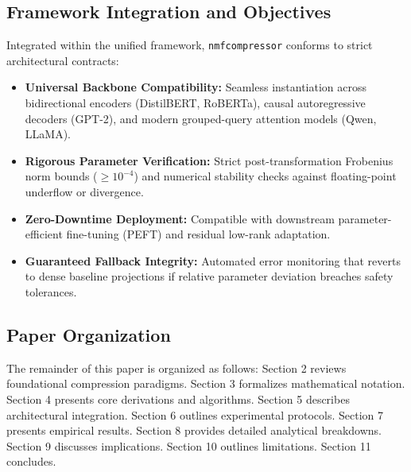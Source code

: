\subsection{Framework Integration and Objectives}
Integrated within the unified framework, \texttt{nmfcompressor} conforms to strict architectural contracts:
\begin{itemize}
\item \textbf{Universal Backbone Compatibility:} Seamless instantiation across bidirectional encoders (DistilBERT, RoBERTa), causal autoregressive decoders (GPT-2), and modern grouped-query attention models (Qwen, LLaMA).
\item \textbf{Rigorous Parameter Verification:} Strict post-transformation Frobenius norm bounds ($\ge 10^{-4}$) and numerical stability checks against floating-point underflow or divergence.
\item \textbf{Zero-Downtime Deployment:} Compatible with downstream parameter-efficient fine-tuning (PEFT) and residual low-rank adaptation.
\item \textbf{Guaranteed Fallback Integrity:} Automated error monitoring that reverts to dense baseline projections if relative parameter deviation breaches safety tolerances.
\end{itemize}

\subsection{Paper Organization}
The remainder of this paper is organized as follows: Section 2 reviews foundational compression paradigms. Section 3 formalizes mathematical notation. Section 4 presents core derivations and algorithms. Section 5 describes architectural integration. Section 6 outlines experimental protocols. Section 7 presents empirical results. Section 8 provides detailed analytical breakdowns. Section 9 discusses implications. Section 10 outlines limitations. Section 11 concludes.

